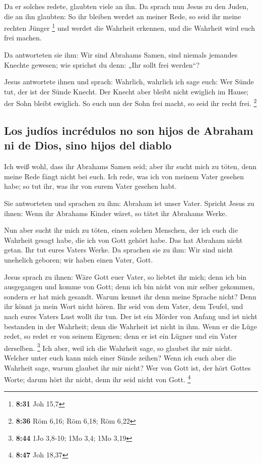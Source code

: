  Da er solches redete, glaubten viele an ihn.
 Da sprach nun Jesus zu den Juden, die an ihn glaubten:
So ihr bleiben werdet an meiner Rede, so seid ihr meine rechten Jünger
\footnote{\textbf{8:31} Joh 15,7}  und werdet die
Wahrheit erkennen, und die Wahrheit wird euch frei machen.

 Da antworteten sie ihm: Wir sind Abrahams Samen, sind
niemals jemandes Knechte gewesen; wie sprichst du denn: „Ihr sollt frei
werden``?

 Jesus antwortete ihnen und sprach: Wahrlich, wahrlich
ich sage euch: Wer Sünde tut, der ist der Sünde Knecht. 
Der Knecht aber bleibt nicht ewiglich im Hause; der Sohn bleibt
ewiglich.  So euch nun der Sohn frei macht, so seid ihr
recht frei. \footnote{\textbf{8:36} Röm 6,16; Röm 6,18; Röm 6,22}

\hypertarget{los-juduxedos-incruxe9dulos-no-son-hijos-de-abraham-ni-de-dios-sino-hijos-del-diablo}{%
\subsection{Los judíos incrédulos no son hijos de Abraham ni de Dios,
sino hijos del
diablo}\label{los-juduxedos-incruxe9dulos-no-son-hijos-de-abraham-ni-de-dios-sino-hijos-del-diablo}}

 Ich weiß wohl, dass ihr Abrahams Samen seid; aber ihr
sucht mich zu töten, denn meine Rede fängt nicht bei euch.
 Ich rede, was ich von meinem Vater gesehen habe; so tut
ihr, was ihr von eurem Vater gesehen habt.

 Sie antworteten und sprachen zu ihm: Abraham ist unser
Vater. Spricht Jesus zu ihnen: Wenn ihr Abrahams Kinder wäret, so tätet
ihr Abrahams Werke.

 Nun aber sucht ihr mich zu töten, einen solchen
Menschen, der ich euch die Wahrheit gesagt habe, die ich von Gott gehört
habe. Das hat Abraham nicht getan.  Ihr tut eures Vaters
Werke. Da sprachen sie zu ihm: Wir sind nicht unehelich geboren; wir
haben einen Vater, Gott.

 Jesus sprach zu ihnen: Wäre Gott euer Vater, so liebtet
ihr mich; denn ich bin ausgegangen und komme von Gott; denn ich bin
nicht von mir selber gekommen, sondern er hat mich gesandt.
 Warum kennet ihr denn meine Sprache nicht? Denn ihr
könnt ja mein Wort nicht hören.  Ihr seid von dem Vater,
dem Teufel, und nach eures Vaters Lust wollt ihr tun. Der ist ein Mörder
von Anfang und ist nicht bestanden in der Wahrheit; denn die Wahrheit
ist nicht in ihm. Wenn er die Lüge redet, so redet er von seinem
Eigenen; denn er ist ein Lügner und ein Vater derselben. \footnote{\textbf{8:44}
  1Jo 3,8-10; 1Mo 3,4; 1Mo 3,19}  Ich aber, weil ich die
Wahrheit sage, so glaubet ihr mir nicht.  Welcher unter
euch kann mich einer Sünde zeihen? Wenn ich euch aber die Wahrheit sage,
warum glaubet ihr mir nicht?  Wer von Gott ist, der hört
Gottes Worte; darum hört ihr nicht, denn ihr seid nicht von Gott.
\footnote{\textbf{8:47} Joh 18,37}

